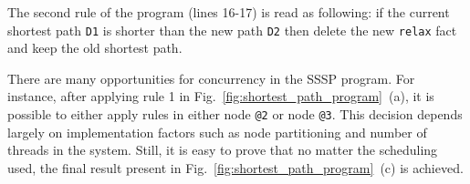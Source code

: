 \begin{figure}[ht]
\begin{center}
  \hspace{0.4cm}
  \hspace{0.4cm}
\end{center}
\end{figure}

The second rule of the program (lines 16-17) is read as following: if the
current shortest path \texttt{D1} is shorter than the new path \texttt{D2} then
delete the new \texttt{relax} fact and keep the old shortest path.

There are many opportunities for concurrency in the SSSP program. For instance,
after applying rule 1 in Fig.~\ref{fig:shortest_path_program}~(a), it is
possible to either apply rules in either node \texttt{@2} or node
\texttt{@3}. This decision depends largely on implementation factors such as node
partitioning and number of threads in the system.
Still, it is easy to prove that no matter the scheduling used,
the final result present in Fig.~\ref{fig:shortest_path_program}~(c) is achieved.

